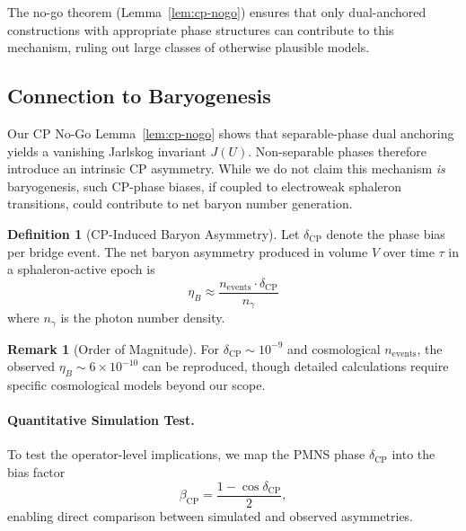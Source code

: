 \documentclass[11pt]{article}
\theoremstyle{plain}
\theoremstyle{definition}
\newtheorem{definition}[theorem]{Definition}
\newtheorem{remark}[theorem]{Remark}
\begin{document}
The no-go theorem (Lemma~\ref{lem:cp-nogo}) ensures that only dual-anchored constructions with appropriate phase structures can contribute to this mechanism, ruling out large classes of otherwise plausible models.

\subsection{Connection to Baryogenesis}

Our CP No-Go Lemma~\ref{lem:cp-nogo} shows that separable-phase dual anchoring yields a vanishing Jarlskog invariant $J(U)$. Non-separable phases therefore introduce an intrinsic CP asymmetry. While we do not claim this mechanism \emph{is} baryogenesis, such CP-phase biases, if coupled to electroweak sphaleron transitions, could contribute to net baryon number generation.

\begin{definition}[CP-Induced Baryon Asymmetry]
  Let $\delta_{\text{CP}}$ denote the phase bias per bridge event. The net baryon asymmetry produced in volume $V$ over time $\tau$ in a sphaleron-active epoch is
  \begin{equation}
    \eta_B \approx \frac{n_{\text{events}} \cdot \delta_{\text{CP}}}{n_\gamma}
  \end{equation}
  where $n_\gamma$ is the photon number density.
\end{definition}

\begin{remark}[Order of Magnitude]
  For $\delta_{\text{CP}} \sim 10^{-9}$ and cosmological $n_{\text{events}}$, the observed $\eta_B \sim 6\times 10^{-10}$ can be reproduced, though detailed calculations require specific cosmological models beyond our scope.
\end{remark}

\paragraph{Quantitative Simulation Test.}
To test the operator-level implications, we map the PMNS phase $\delta_{\mathrm{CP}}$ into the bias factor
\[
  \beta_{\mathrm{CP}} = \frac{1 - \cos \delta_{\mathrm{CP}}}{2},
\]
enabling direct comparison between simulated and observed asymmetries.
\end{document}
